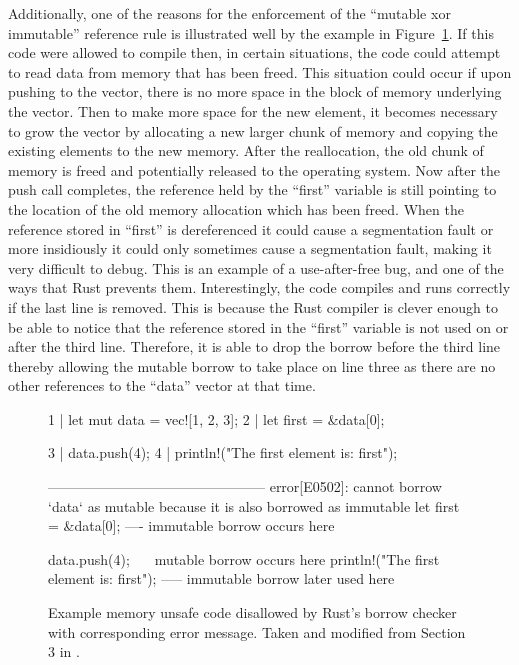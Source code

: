 Additionally, one of the reasons for the enforcement of the ``mutable xor
immutable'' reference rule is illustrated well by the example in
Figure~\ref{fig:rust-xor-borrow-rule}. If this code were allowed to compile
then, in certain situations, the code could attempt to read data from memory
that has been freed. This situation could occur if upon pushing to the vector,
there is no more space in the block of memory underlying the vector. Then to
make more space for the new element, it becomes necessary to grow the vector by
allocating a new larger chunk of memory and copying the existing elements to
the new memory. After the reallocation, the old chunk of memory is freed and
potentially released to the operating system. Now after the push call
completes, the reference held by the ``first'' variable is still pointing to
the location of the old memory allocation which has been freed. When the
reference stored in ``first'' is dereferenced it could cause a segmentation
fault or more insidiously it could only sometimes cause a segmentation fault,
making it very difficult to debug. This is an example of a use-after-free bug,
and one of the ways that Rust prevents them. Interestingly, the code compiles
and runs correctly if the last line is removed. This is because the Rust
compiler is clever enough to be able to notice that the reference stored in the
``first'' variable is not used on or after the third line. Therefore, it is
able to drop the borrow before the third line thereby allowing the mutable
borrow to take place on line three as there are no other references to the
``data'' vector at that time.

\begin{figure}[h]
    \centering
    \begin{boxedverbatim}


1 | let mut data = vec![1, 2, 3];
2 | let first = &data[0];

3 | data.push(4);
4 | println!("The first element is: {first}");

-----------------------------------------------
error[E0502]: cannot borrow `data` as mutable because it is also borrowed as immutable
let first = &data[0];
             ---- immutable borrow occurs here

data.push(4);
^^^^^^^^^^^^ mutable borrow occurs here
println!("The first element is: {first}");
                                 ----- immutable borrow later used here
    \end{boxedverbatim}
    \caption[Example of memory unsafe code prevented by Rust]{Example memory
    unsafe code disallowed by Rust's borrow checker with corresponding error
    message. Taken and modified from Section 3 in \cite{rust-nomicon}.}
    \label{fig:rust-xor-borrow-rule}
\end{figure}

